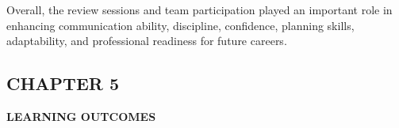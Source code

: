 \documentclass[10pt]{article}
\begin{document}
\noindent
Overall, the review sessions and team participation played an important role in enhancing communication ability, discipline, confidence, planning skills, adaptability, and professional readiness for future careers.

\newpage
{}
\begin{flushleft}
{\fontsize{16pt}{16pt}\selectfont
\section*{CHAPTER 5}}
\end{flushleft}

\begin{center}
{\fontsize{18pt}{18pt}\selectfont \textbf{LEARNING OUTCOMES}}
\end{center}

\onehalfspacing
\fontsize{12pt}{14pt}\selectfont
\setlength{\parskip}{5pt}
 
\end{document}
